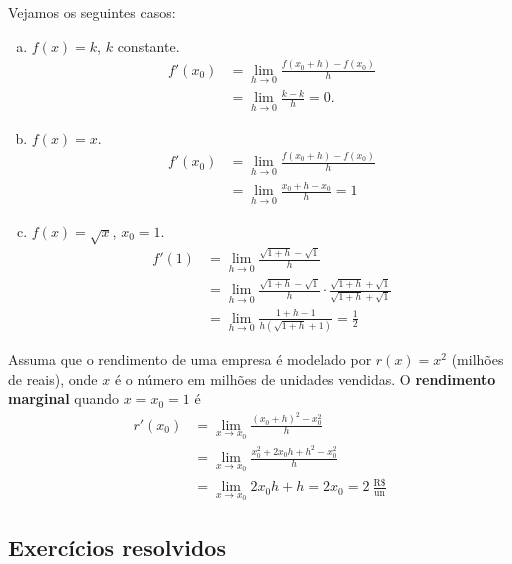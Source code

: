 \cleardoublepage\documentclass[../main.tex]{subfiles}
\begin{document}
\begin{ex}
  Vejamos os seguintes casos:
  \begin{enumerate}[a)]
  \item $f(x) = k$, $k$ constante.
    \begin{align*}
      f'(x_0) &= \lim_{h\to 0} \frac{f(x_0+h)-f(x_0)}{h}\\
              &= \lim_{h\to 0} \frac{k-k}{h} = 0.
    \end{align*}
  \item $f(x) = x$.
    \begin{align*}
      f'(x_0) &= \lim_{h\to 0} \frac{f(x_0+h)-f(x_0)}{h} \\
              &= \lim_{h\to 0} \frac{x_0+h-x_0}{h} = 1
    \end{align*}
  \item $f(x) = \sqrt{x}$, $x_0=1$.
    \begin{align*}
      f'(1) &= \lim_{h\to 0} \frac{\sqrt{1+h}-\sqrt{1}}{h}\\
            &= \lim_{h\to 0} \frac{\sqrt{1+h}-\sqrt{1}}{h} \cdot \frac{\sqrt{1+h}+\sqrt{1}}{\sqrt{1+h}+\sqrt{1}}\\
            &= \lim_{h\to 0} \frac{1+h-1}{h(\sqrt{1+h}+1)} = \frac{1}{2}
    \end{align*}
  \end{enumerate}
\end{ex}

\begin{ex}
  Assuma que o rendimento de uma empresa é modelado por $r(x) = x^2$ (milhões de reais), onde $x$ é o número em milhões de unidades vendidas. O {\bf rendimento marginal} quando $x=x_0=1$ é
  \begin{align*}
    r'(x_0) &= \lim_{x\to x_0}\frac{(x_0+h)^2-x_0^2}{h}\\
            &= \lim_{x\to x_0}\frac{x_0^2+2x_0h+h^2-x_0^2}{h}\\
            &= \lim_{x\to x_0} 2x_0h + h = 2x_0 = 2~\frac{\text{R\$}}{\text{un}}
  \end{align*}
\end{ex}

\subsection{Exercícios resolvidos}
\end{document}
